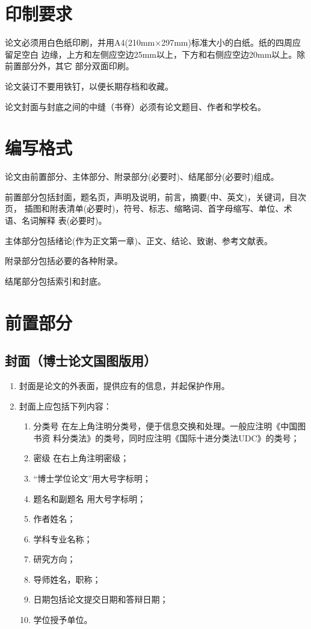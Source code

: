 \documentclass[oneside, phd]{njuthesis}
\begin{document}
\section{印制要求}

论文必须用白色纸印刷，并用A4(210mm×297mm)标准大小的白纸。纸的四周应留足空白
边缘，上方和左侧应空边25mm以上，下方和右侧应空边20mm以上。除前置部分外，其它
部分双面印刷。

论文装订不要用铁钉，以便长期存档和收藏。

论文封面与封底之间的中缝（书脊）必须有论文题目、作者和学校名。

\section{编写格式}

论文由前置部分、主体部分、附录部分(必要时)、结尾部分(必要时)组成。

前置部分包括封面，题名页，声明及说明，前言，摘要(中、英文)，关键词，目次页，
插图和附表清单(必要时)，符号、标志、缩略词、首字母缩写、单位、术语、名词解释
表(必要时)。

主体部分包括绪论(作为正文第一章)、正文、结论、致谢、参考文献表。

附录部分包括必要的各种附录。

结尾部分包括索引和封底。

\section{前置部分}

\subsection{封面（博士论文国图版用）}

\begin{enumerate}
\item 封面是论文的外表面，提供应有的信息，并起保护作用。
\item 封面上应包括下列内容：
  \begin{enumerate}
  \item 分类号  在左上角注明分类号，便于信息交换和处理。一般应注明《中国图书资
    料分类法》的类号，同时应注明《国际十进分类法UDC》的类号；
  \item 密级  在右上角注明密级；
  \item “博士学位论文”用大号字标明；
  \item 题名和副题名   用大号字标明；
  \item 作者姓名；
  \item 学科专业名称；
  \item 研究方向；
  \item 导师姓名，职称；
  \item 日期包括论文提交日期和答辩日期；
  \item 学位授予单位。
  \end{enumerate}
\end{enumerate}
\end{document}
